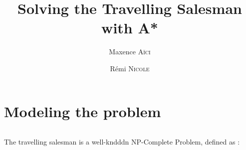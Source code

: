 \documentclass[french]{article}
\title{Solving the Travelling Salesman with A*}
\author{Maxence \textsc{Aïci} \and Rémi \textsc{Nicole}}
\begin{document}
\maketitle

\part{Modeling the problem}

\paragraph{}
The travelling salesman is a well-kndddn NP-Complete Problem, defined as \cite{wiki:tsp}:

\printbibliography
\end{document}
